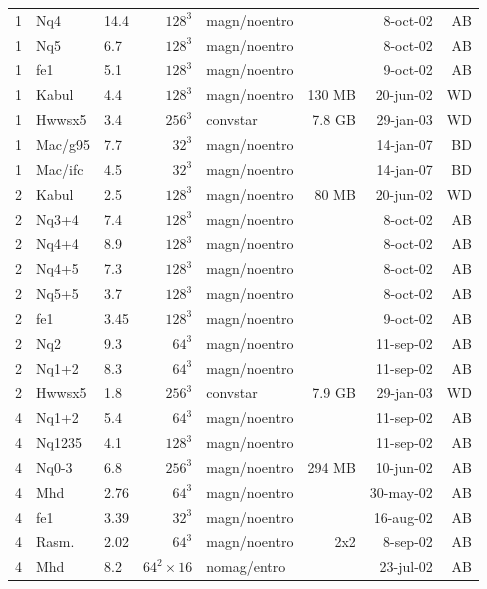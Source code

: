 \documentclass[\mydriver,12pt,twoside,notitlepage,a4paper]{article}
\begin{document}
\begin{center}
\begin{footnotesize}
\begin{longtable}{rllrlrrr}
   1 & Nq4   &14.4  & $128^3$ & magn/noentro &        &  8-oct-02 & AB \\
   1 & Nq5   & 6.7  & $128^3$ & magn/noentro &        &  8-oct-02 & AB \\
   1 & fe1   & 5.1  & $128^3$ & magn/noentro &        &  9-oct-02 & AB \\
   1 & Kabul & 4.4  & $128^3$ & magn/noentro & 130 MB & 20-jun-02 & WD \\
   1 & Hwwsx5& 3.4  & $256^3$ & convstar     & 7.8 GB & 29-jan-03 & WD \\
   1 &Mac/g95& 7.7  & $32^3$  & magn/noentro &        & 14-jan-07 & BD \\
   1 &Mac/ifc& 4.5  & $32^3$  & magn/noentro &        & 14-jan-07 & BD \\
   2 & Kabul & 2.5  & $128^3$ & magn/noentro &  80 MB & 20-jun-02 & WD \\
   2 & Nq3+4 & 7.4  & $128^3$ & magn/noentro &        &  8-oct-02 & AB \\
   2 & Nq4+4 & 8.9  & $128^3$ & magn/noentro &        &  8-oct-02 & AB \\
   2 & Nq4+5 & 7.3  & $128^3$ & magn/noentro &        &  8-oct-02 & AB \\
   2 & Nq5+5 & 3.7  & $128^3$ & magn/noentro &        &  8-oct-02 & AB \\
   2 & fe1   & 3.45 & $128^3$ & magn/noentro &        &  9-oct-02 & AB \\
   2 & Nq2   & 9.3  &  $64^3$ & magn/noentro &        & 11-sep-02 & AB \\
   2 & Nq1+2 & 8.3  &  $64^3$ & magn/noentro &        & 11-sep-02 & AB \\
   2 & Hwwsx5& 1.8  & $256^3$ & convstar     & 7.9 GB & 29-jan-03 & WD \\
   4 & Nq1+2 & 5.4  &  $64^3$ & magn/noentro &        & 11-sep-02 & AB \\
   4 & Nq1235& 4.1  & $128^3$ & magn/noentro &        & 11-sep-02 & AB \\
   4 & Nq0-3 & 6.8  & $256^3$ & magn/noentro & 294 MB & 10-jun-02 & AB \\
   4 & Mhd   & 2.76 &  $64^3$ & magn/noentro &        & 30-may-02 & AB \\
   4 & fe1   & 3.39 &  $32^3$ & magn/noentro &        & 16-aug-02 & AB \\
   4 & Rasm. & 2.02 &  $64^3$ & magn/noentro &  2x2   &  8-sep-02 & AB \\
   4 & Mhd   & 8.2  &  $64^2{\!\times\!}16$
                              & nomag/entro &        & 23-jul-02 & AB \\

\end{longtable}
\end{footnotesize}
\end{center}
\end{document}
